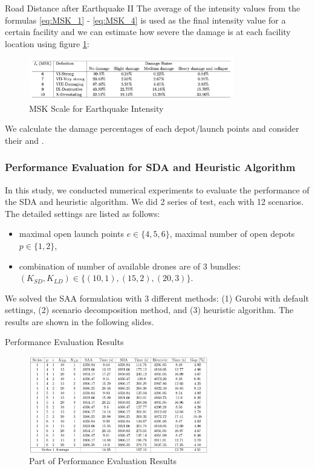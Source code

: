 \documentclass[aspectratio=169]{beamer}
\begin{document}
\begin{frame}{Road Distance after Earthquake II}
The average of the intensity values from the formulas \eqref{eq:MSK_1} - \eqref{eq:MSK_4} is used as the final intensity value for a certain facility and we can estimate how severe the damage is at each facility location using figure \ref{fig:MSK_scale}:
\begin{figure}
    \centering
    \includegraphics[width=0.8\textwidth]{eq_tab.png}
    \vspace{-10pt}
    \caption{MSK Scale for Earthquake Intensity}
    \label{fig:MSK_scale}
\end{figure}
\vspace{-5pt}
We calculate the damage percentages of each depot/launch points and consider their  and . 
\end{frame}

\begin{frame}\frametitle{Performance Evaluation for SDA and Heuristic Algorithm}
In this study, we conducted numerical experiments to evaluate the performance of the SDA and heuristic algorithm. We did 2 series of test, each with 12 scenarios. The detailed settings are listed as follows:
    \begin{itemize}[label=$\star$]
        \item maximal open launch points $e \in \{ 4, 5, 6\}$, maximal number of open depots $p \in \{1,2\}$,
        \item combination of number of available drones are of 3 bundles: $(K_{SD},K_{LD}) \in \{(10,1),(15,2),(20,3)\}$.
    \end{itemize}
\vspace{1em}
We solved the SAA formulation with 3 different methods: (1) Gurobi with default settings, (2) scenario decomposition method, and (3) heuristic algorithm. The results are shown in the following slides.
\end{frame}

\begin{frame}{Performance Evaluation Results}
\begin{figure}
    \centering
    \includegraphics[width=0.7\textwidth]{fig_performance_evaluation.png}
    \caption{Part of Performance Evaluation Results}
    \label{fig:pe_result}
\end{figure}
    
\end{frame}
\end{document}
